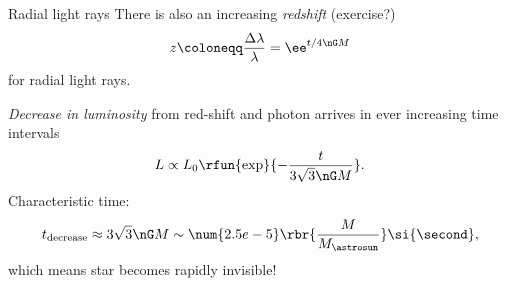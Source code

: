 \begin{nameddef}{Radial light rays}
There is also an increasing \emph{redshift} (exercise?)
\begin{equation}
z \coloneqq \frac{\Delta\lambda}{\lambda} = \ee^{t/4\nG M}
\end{equation}
for radial light rays.

\emph{Decrease in luminosity} from red-shift and photon arrives in ever
increasing time intervals \cite{Ames1968}
\begin{equation}
L \propto L_0\rfun{\exp}{-\frac{t}{3\sqrt{3}\nG M}}.
\end{equation}
Characteristic time:
\begin{equation}
t_\text{decrease}\approx 3\sqrt{3}\nG M
\sim\num{2.5e-5}\rbr{\frac{M}{M_\astrosun}}\si{\second},
\end{equation}
which means star becomes rapidly invisible!

\end{nameddef} %

